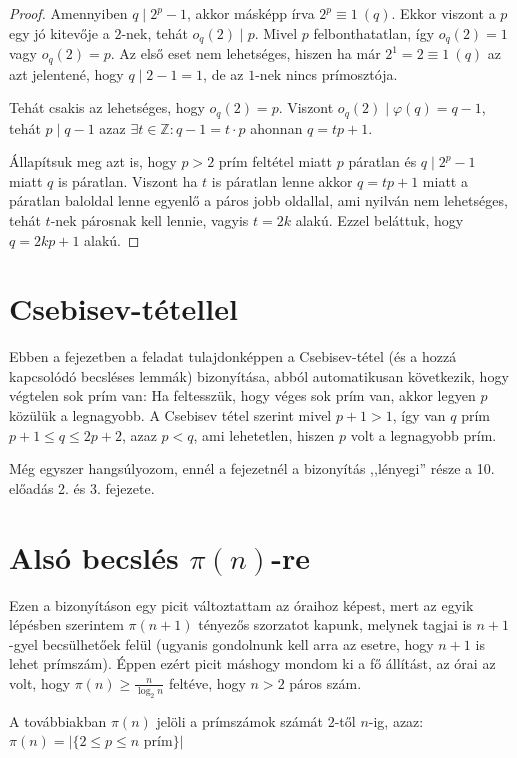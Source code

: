 \documentclass[12pt]{book}
\theoremstyle{plain} %
\theoremstyle{definition} %
\theoremstyle{remark}
\numberwithin{equation}{section}  %
\def\Z{\mathbb{Z}}
\begin{document}
	\begin{proof}
		Amennyiben $q\mid 2^p - 1$, akkor másképp írva $2^p \equiv 1\ (q)$. Ekkor viszont a $p$ egy jó kitevője a $2$-nek, tehát $o_q(2) \mid p$. Mivel $p$ felbonthatatlan, így $o_q(2)=1$ vagy $o_q(2)=p$. Az első eset nem lehetséges, hiszen ha már $2^1 = 2 \equiv 1\ (q)$ az azt jelentené, hogy $q\mid 2-1 = 1 $, de az $1$-nek nincs prímosztója.
		
		Tehát csakis az lehetséges, hogy $o_q(2) = p$. Viszont $o_q(2)\mid \varphi(q) = q - 1$, tehát $p\mid q - 1$ azaz $\exists t\in \Z\colon q-1 = t\cdot p$ ahonnan $q=tp + 1$.
		
		Állapítsuk meg azt is, hogy $p>2$ prím feltétel miatt $p$ páratlan és $q\mid 2^p-1$ miatt $q$ is páratlan. Viszont ha $t$ is páratlan lenne akkor $q=tp+1$ miatt a páratlan baloldal lenne egyenlő a páros jobb oldallal, ami nyilván nem lehetséges, tehát $t$-nek párosnak kell lennie, vagyis $t=2k$ alakú. Ezzel beláttuk, hogy $q=2kp+1$ alakú.
	\end{proof}
	
	\section{Csebisev-tétellel}
	
	Ebben a fejezetben a feladat tulajdonképpen a Csebisev-tétel (és a hozzá kapcsolódó becsléses lemmák) bizonyítása, abból automatikusan következik, hogy végtelen sok prím van: Ha feltesszük, hogy véges sok prím van, akkor legyen $p$ közülük a legnagyobb. A Csebisev tétel szerint mivel $p+1>1$, így van $q$ prím $p+1\leq q \leq 2p+2$, azaz $p < q$, ami lehetetlen, hiszen $p$ volt a legnagyobb prím.
	
	Még egyszer hangsúlyozom, ennél a fejezetnél a bizonyítás ,,lényegi'' része a 10. előadás 2. és 3. fejezete.
	
	\section{Alsó becslés $\pi(n)$-re}
	
	Ezen a bizonyításon egy picit változtattam az óraihoz képest, mert az egyik lépésben szerintem $\pi(n+1)$ tényezős szorzatot kapunk, melynek tagjai is $n+1$-gyel becsülhetőek felül (ugyanis gondolnunk kell arra az esetre, hogy $n+1$ is lehet prímszám). Éppen ezért picit máshogy mondom ki a fő állítást, az órai az volt, hogy $\pi(n) \geq \frac{n}{\log_2 n}$ feltéve, hogy $n>2$ páros szám.
	
	A továbbiakban $\pi(n)$ jelöli a prímszámok számát $2$-től $n$-ig, azaz: $\pi(n) = | \{2 \leq p \leq n \text{ prím}  \} |$
	
\end{document}
